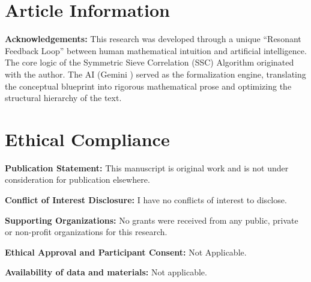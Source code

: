 \documentclass[twoside,9pt]{extarticle}
\begin{document}
\section*{Article Information}
\textbf{Acknowledgements:} This research was developed through a unique ``Resonant Feedback Loop'' between human mathematical intuition and artificial intelligence. The core logic of the 
Symmetric Sieve Correlation (SSC) Algorithm originated with the author. The AI (Gemini \cite{gemini2025}) served as the formalization engine, translating the conceptual blueprint into rigorous mathematical prose and optimizing the structural hierarchy of the text. 

\section*{Ethical Compliance}
\noindent \textbf{Publication Statement:} This manuscript is original work and is not under consideration for publication elsewhere. 

\noindent \textbf{Conflict of Interest Disclosure:} I have no conflicts of interest to disclose.   

\noindent \textbf{Supporting Organizations:} No grants were received from any public, private or non-profit organizations for this research. 

\noindent \textbf{Ethical Approval and Participant Consent:} Not Applicable. 

\noindent \textbf{Availability of data and materials:} Not applicable.


\raggedright
\end{document}
